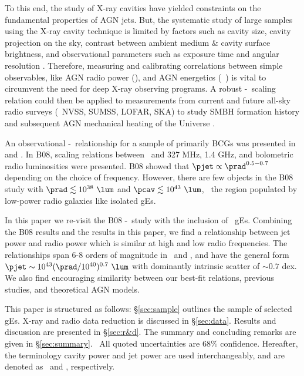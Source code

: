 \documentclass{emulateapj}
\begin{document}
To this end, the study of X-ray cavities have yielded constraints on
the fundamental properties of AGN jets. But, the systematic study of
large samples using the X-ray cavity technique is limited by factors
such as cavity size, cavity projection on the sky, contrast between
ambient medium \& cavity surface brightness, and observational
parameters such as exposure time and angular resolution
\citep{2009arXiv0909.0397B}. Therefore, measuring and calibrating
correlations between simple observables, like AGN radio power (\prad),
and AGN energetics (\eg\ \pjet) is vital to circumvent the need for
deep X-ray observing programs. A robust \pjet-\prad\ scaling relation
could then be applied to measurements from current and future all-sky
radio surveys (\eg\ NVSS, SUMSS, LOFAR, SKA) to study SMBH formation
history and subsequent AGN mechanical heating of the Universe
\citep{croton06, 2006MNRAS.366..397S}.

An observational \pjet-\prad\ relationship for a sample of primarily
BCGs was presented in \citet[][hereafter B04]{birzan04} and
\citet[][hereafter B08]{birzan08}. In B08, scaling relations between
\pjet\ and 327 MHz, 1.4 GHz, and bolometric radio luminosities were
presented. B08 showed that $\pjet \propto \prad^{0.5-0.7}$ depending
on the choice of frequency. However, there are few objects in the B08
study with $\prad \lesssim 10^{38} ~\lum$ and $\pcav \lesssim 10^{43}
~\lum$, \ie\ the region populated by low-power radio galaxies like
isolated gEs.

In this paper we re-visit the B08 \pjet-\prad\ study with the
inclusion of \samp\ gEs. Combining the B08 results and the results in
this paper, we find a relationship between jet power and radio power
which is similar at high and low radio frequencies. The relationships
span 6-8 orders of magnitude in \pjet\ and \prad, and have the general
form $\pjet \sim 10^{43} (\prad/10^{40})^{0.7} ~\lum$ with dominantly
intrinsic scatter of $\sim 0.7$ dex. We also find encouraging
similarity between our best-fit relations, previous studies, and
theoretical AGN models.

This paper is structured as follows: \S\ref{sec:sample} outlines the
sample of selected gEs. X-ray and radio data reduction is discussed in
\S\ref{sec:data}. Results and discussion are presented in
\S\ref{sec:r&d}. The summary and concluding remarks are given in
\S\ref{sec:summary}. \LCDM\ All quoted uncertainties are 68\%
confidence. Hereafter, the terminology cavity power and jet power are
used interchangeably, and are denoted as \pcav\ and \pjet,
respectively.
\end{document}
